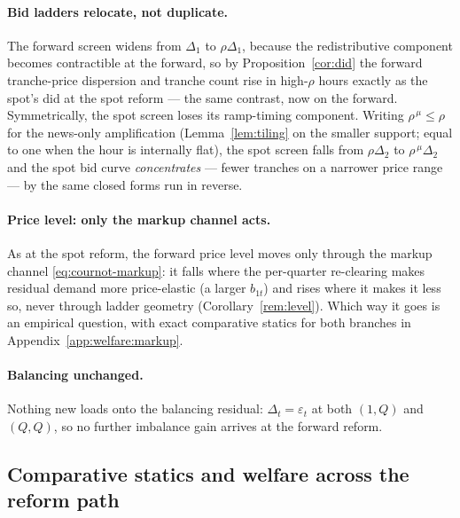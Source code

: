 \documentclass[11pt,a4paper]{article}
\theoremstyle{definition}
\theoremstyle{remark}
\theoremstyle{plain}
\begin{document}
\paragraph{Bid ladders relocate, not duplicate.} The forward screen widens from $\Delta_1$ to $\rho\Delta_1$, because the redistributive component becomes contractible at the forward, so by Proposition~\ref{cor:did} the forward tranche-price dispersion and tranche count rise in high-$\rho$ hours exactly as the spot's did at the spot reform --- the same contrast, now on the forward. Symmetrically, the spot screen loses its ramp-timing component. Writing $\rho^{\,\mu} \le \rho$ for the news-only amplification (Lemma~\ref{lem:tiling} on the smaller support; equal to one when the hour is internally flat), the spot screen falls from $\rho\Delta_2$ to $\rho^{\,\mu}\Delta_2$ and the spot bid curve \emph{concentrates} --- fewer tranches on a narrower price range --- by the same closed forms run in reverse.

\paragraph{Price level: only the markup channel acts.} As at the spot reform, the forward price level moves only through the markup channel \eqref{eq:cournot-markup}: it falls where the per-quarter re-clearing makes residual demand more price-elastic (a larger $b_{1t}$) and rises where it makes it less so, never through ladder geometry (Corollary~\ref{rem:level}). Which way it goes is an empirical question, with exact comparative statics for both branches in Appendix~\ref{app:welfare:markup}.

\paragraph{Balancing unchanged.} Nothing new loads onto the balancing residual: $\Delta_t = \varepsilon_t$ at both $(1,Q)$ and $(Q,Q)$, so no further imbalance gain arrives at the forward reform.

\subsection{Comparative statics and welfare across the reform path}\label{sec:theory:speaks}
\end{document}
